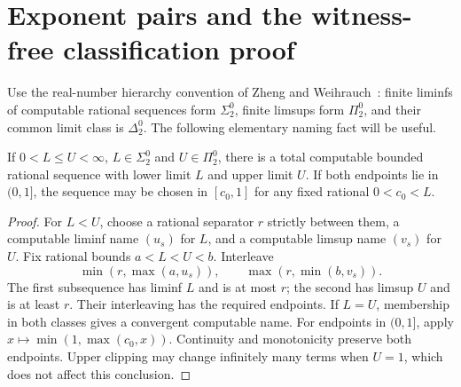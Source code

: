 \section{Exponent pairs and the witness-free classification proof}\label{sec:profile-pairs}
Use the real-number hierarchy convention of Zheng and Weihrauch~\cite{ZW01}: finite liminfs of computable rational sequences form $\Sigma^0_2$, finite limsups form $\Pi^0_2$, and their common limit class is $\Delta^0_2$. The following elementary naming fact will be useful.

\begin{lemma}\label{lem:profile-names}
If $0<L\le U<\infty$, $L\in\Sigma^0_2$ and $U\in\Pi^0_2$, there is a total computable bounded rational sequence with lower limit $L$ and upper limit $U$. If both endpoints lie in $(0,1]$, the sequence may be chosen in $[c_0,1]$ for any fixed rational $0<c_0<L$.
\end{lemma}
\begin{proof}
For $L<U$, choose a rational separator $r$ strictly between them, a computable liminf name $(u_s)$ for $L$, and a computable limsup name $(v_s)$ for $U$. Fix rational bounds $a<L<U<b$. Interleave
\[
 \min(r,\max(a,u_s)),\qquad \max(r,\min(b,v_s)).
\]
The first subsequence has liminf $L$ and is at most $r$; the second has limsup $U$ and is at least $r$. Their interleaving has the required endpoints. If $L=U$, membership in both classes gives a convergent computable name. For endpoints in $(0,1]$, apply $x\mapsto\min(1,\max(c_0,x))$. Continuity and monotonicity preserve both endpoints. Upper clipping may change infinitely many terms when $U=1$, which does not affect this conclusion.
\end{proof}

